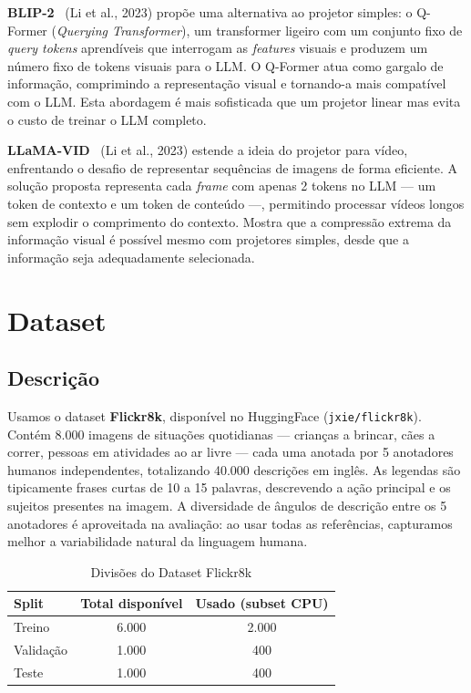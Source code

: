\documentclass[conference]{IEEEtran}
\begin{document}
\textbf{BLIP-2}~\cite{b5} (Li et al., 2023) propõe uma alternativa ao projetor simples: o Q-Former (\textit{Querying Transformer}), um transformer ligeiro com um conjunto fixo de \textit{query tokens} aprendíveis que interrogam as \textit{features} visuais e produzem um número fixo de tokens visuais para o LLM. O Q-Former atua como gargalo de informação, comprimindo a representação visual e tornando-a mais compatível com o LLM. Esta abordagem é mais sofisticada que um projetor linear mas evita o custo de treinar o LLM completo.

\textbf{LLaMA-VID}~\cite{b2} (Li et al., 2023) estende a ideia do projetor para vídeo, enfrentando o desafio de representar sequências de imagens de forma eficiente. A solução proposta representa cada \textit{frame} com apenas 2 tokens no LLM --- um token de contexto e um token de conteúdo ---, permitindo processar vídeos longos sem explodir o comprimento do contexto. Mostra que a compressão extrema da informação visual é possível mesmo com projetores simples, desde que a informação seja adequadamente selecionada.


\section{Dataset}

\subsection{Descrição}

Usamos o dataset \textbf{Flickr8k}, disponível no HuggingFace (\texttt{jxie/flickr8k}). Contém 8.000 imagens de situações quotidianas --- crianças a brincar, cães a correr, pessoas em atividades ao ar livre --- cada uma anotada por 5 anotadores humanos independentes, totalizando 40.000 descrições em inglês. As legendas são tipicamente frases curtas de 10 a 15 palavras, descrevendo a ação principal e os sujeitos presentes na imagem. A diversidade de ângulos de descrição entre os 5 anotadores é aproveitada na avaliação: ao usar todas as referências, capturamos melhor a variabilidade natural da linguagem humana.

\begin{table}[htbp]
\caption{Divisões do Dataset Flickr8k}
\begin{center}
\begin{tabular}{lcc}
\toprule
\textbf{Split} & \textbf{Total disponível} & \textbf{Usado (subset CPU)} \\
\midrule
Treino      & 6.000 & 2.000 \\
Validação   & 1.000 & 400   \\
Teste       & 1.000 & 400   \\
\bottomrule
\end{tabular}
\label{tab:dataset}
\end{center}
\end{table}
\end{document}
